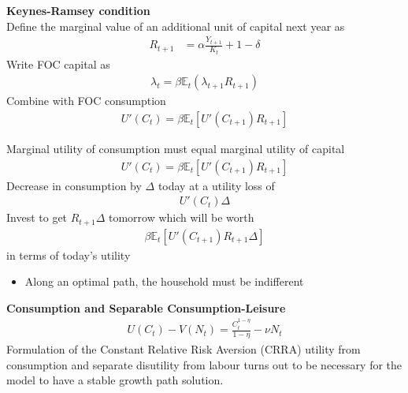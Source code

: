 \documentclass{beamer}
\begin{document}
\begin{frame}
 \textbf{Keynes-Ramsey condition}\\
 Define the marginal value of an additional unit of capital next year as
\begin{align}
  R_{t+1}&= \alpha \frac{Y_{t+1}}{K_t}+1-\delta
\end{align}
Write FOC capital as
\begin{align}
  \lambda_t=\beta \mathbb{E}_t(\lambda_{t+1}R_{t+1})
\end{align}
Combine with FOC consumption
\begin{align}
  U'(C_t)= \beta \mathbb{E}_t[U'(C_{t+1})R_{t+1}]
\end{align}
\end{frame}

\begin{frame}
Marginal utility of consumption must equal marginal utility of capital
\begin{align*}
  U'(C_t)= \beta \mathbb{E}_t[U'(C_{t+1})R_{t+1}]
\end{align*}
  Decrease in consumption by $\Delta$ today at a utility loss of 
 \begin{align*}
    U'(C_t)\Delta
  \end{align*} 
  Invest to get $R_{t+1}\Delta$ tomorrow which will be worth
 \begin{align*}
  \beta \mathbb{E}_t[U'(C_{t+1})R_{t+1}\Delta]
 \end{align*}
 in terms of today's utility
 \begin{itemize}
   \item Along an optimal path, the household must be indifferent 
 \end{itemize}
\end{frame}

\begin{frame}
  \textbf{Consumption and Separable Consumption-Leisure}\\
  \begin{align}
  U(C_t)-V(N_t)=\frac{C_t^{1-\eta}}{1-\eta}-\nu N_t
  \end{align}
  Formulation of the Constant Relative Risk Aversion (CRRA) utility from consumption and separate disutility from labour turns out to be necessary for the model to have a stable growth path solution.
\end{frame}
\end{document}
